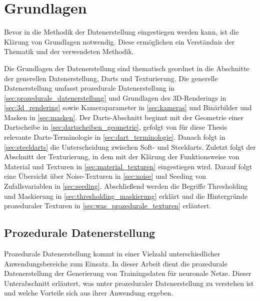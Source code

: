 
\section{Grundlagen}
\label{sec:daten:grundlagen}

Bevor in die Methodik der Datenerstellung eingestiegen werden kann, ist die Klärung von Grundlagen notwendig. Diese ermöglichen ein Verständnis der Thematik und der verwendeten Methodik.

Die Grundlagen der Datenerstellung sind thematisch geordnet in die Abschnitte der generellen Datenerstellung, Darts und Texturierung. Die generelle Datenerstellung umfasst prozedurale Datenerstellung in \autoref{sec:prozedurale_datenerstellung} und Grundlagen des 3D-Renderings in \autoref{sec:3d_rendering} sowie Kameraparameter in \autoref{sec:kameras} und Binärbilder und Masken in \autoref{sec:masken}. Der Darts-Abschnitt beginnt mit der Geometrie einer Dartscheibe in \autoref{sec:dartscheiben_geometrie}, gefolgt von für diese Thesis relevante Darts-Terminologie in \autoref{sec:dart_terminologie}. Danach folgt in \autoref{sec:steeldarts} die Unterscheidung zwischen Soft- und Steeldarts. Zuletzt folgt der Abschnitt der Texturierung, in dem mit der Klärung der Funktionsweise von Material und Texturen in \autoref{sec:material_texturen} eingestiegen wird. Darauf folgt eine Übersicht über Noise-Texturen in \autoref{sec:noise} und Seeding von Zufallsvariablen in \autoref{sec:seeding}. Abschließend werden die Begriffe Thresholding und Maskierung in \autoref{sec:thresholding_maskierung} erklärt und die Hintergründe prozeduraler Texturen in \autoref{sec:was_prozedurale_texturen} erläutert.


\subsection{Prozedurale Datenerstellung}  %
\label{sec:prozedurale_datenerstellung}

Prozedurale Datenerstellung kommt in einer Vielzahl unterschiedlicher Anwendungsbereiche zum Einsatz. In dieser Arbeit dient die prozedurale Datenerstellung der Generierung von Trainingsdaten für neuronale Netze. Dieser Unterabschnitt erläutert, was unter prozeduraler Datenerstellung zu verstehen ist und welche Vorteile sich aus ihrer Anwendung ergeben.

